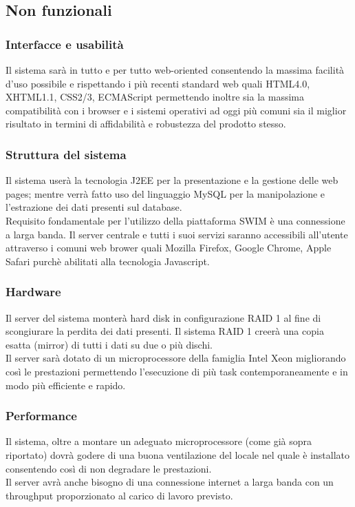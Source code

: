\documentclass[a4paper,12pt]{article}
\begin{document}
\subsection{Non funzionali}
\subsubsection{Interfacce e usabilità}
Il sistema sarà in tutto e per tutto web-oriented consentendo la massima facilità d'uso possibile e rispettando i più recenti standard web quali HTML4.0, XHTML1.1, CSS2/3, ECMAScript permettendo inoltre sia la massima compatibilità con i browser e i sistemi operativi ad oggi più comuni sia il miglior risultato in termini di affidabilità e robustezza del prodotto stesso.

\subsubsection{Struttura del sistema}
Il sistema userà la tecnologia J2EE per la presentazione e la gestione delle web pages; mentre verrà fatto uso del linguaggio MySQL per la manipolazione e l'estrazione dei dati presenti sul database. \\[1\baselineskip]
Requisito fondamentale per l'utilizzo della piattaforma SWIM è una connessione a larga banda. Il server centrale e tutti i suoi servizi saranno accessibili all'utente attraverso i comuni web brower quali Mozilla Firefox, Google Chrome, Apple Safari purchè abilitati alla tecnologia Javascript.

\subsubsection{Hardware}
Il server del sistema monterà hard disk in configurazione RAID 1 al fine di scongiurare la perdita dei dati presenti. Il sistema RAID 1 creerà una copia esatta (mirror) di tutti i dati su due o più dischi. \\[1\baselineskip]
Il server sarà dotato di un microprocessore della famiglia Intel Xeon migliorando così le prestazioni permettendo l'esecuzione di più task contemporaneamente e in modo più efficiente e rapido.

\subsubsection{Performance}
Il sistema, oltre a montare un adeguato microprocessore (come già sopra riportato) dovrà godere di una buona ventilazione del locale nel quale è installato consentendo così di non degradare le prestazioni. \\[1\baselineskip]
Il server avrà anche bisogno di una connessione internet a larga banda con un throughput proporzionato al carico di lavoro previsto.
\end{document}
